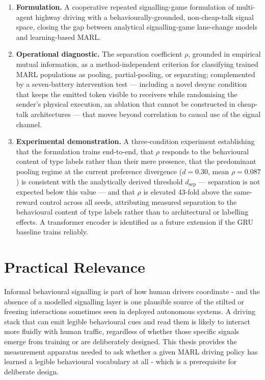 \documentclass[12pt,a4paper]{article}
\begin{document}
\begin{enumerate}
    \item \textbf{Formulation.} A cooperative repeated signalling-game formulation of
    multi-agent highway driving with a behaviourally-grounded, non-cheap-talk signal space,
    closing the gap between analytical signalling-game lane-change
    models~\cite{shao2020discretionary} and learning-based MARL.

    \item \textbf{Operational diagnostic.} The separation coefficient $\rho$, grounded in
    empirical mutual information, as a method-independent criterion for classifying trained MARL
    populations as pooling, partial-pooling, or separating; complemented by a seven-battery
    intervention test --- including a novel desync condition that keeps the emitted token visible
    to receivers while randomising the sender's physical execution, an ablation that cannot be
    constructed in cheap-talk architectures --- that moves beyond correlation to causal use of
    the signal channel.

    \item \textbf{Experimental demonstration.} A three-condition experiment establishing that
    the formulation trains end-to-end, that $\rho$ responds to the behavioural content of type
    labels rather than their mere presence, that the predominant pooling regime at the current preference divergence ($d=0.30$, mean
    $\rho=0.087$) is consistent with the analytically derived threshold $d_{\text{sep}}$ ---
    separation is not expected below this value --- and that $\rho$ is elevated 43-fold above
    the same-reward control across all seeds, attributing measured separation to the
    behavioural content of type labels rather than to architectural or labelling effects.
    A transformer encoder is identified as a future extension if the GRU baseline trains reliably.
\end{enumerate}

\section{Practical Relevance}

Informal behavioural signalling is part of how human drivers coordinate - and the absence of a
modelled signalling layer is one plausible source of the stilted or freezing interactions sometimes
seen in deployed autonomous systems. A driving stack that can emit legible behavioural cues and
read them is likely to interact more fluidly with human traffic, regardless of whether those
specific signals emerge from training or are deliberately designed. This thesis provides the
measurement apparatus needed to ask whether a given MARL driving policy has learned a
legible behavioural vocabulary at all - which is a prerequisite for deliberate design.




\end{document}
